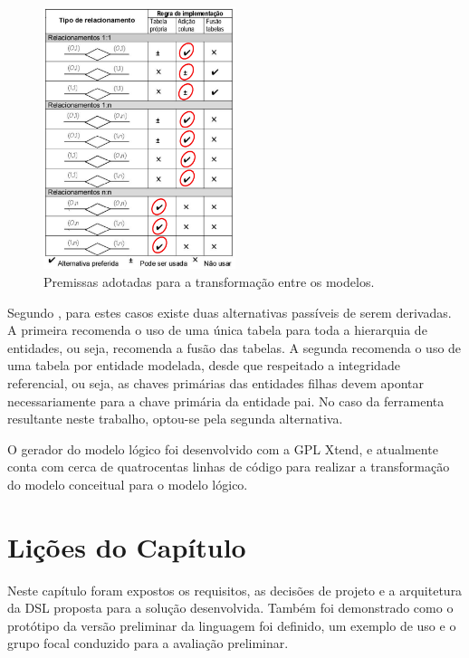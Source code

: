 \begin{figure}[!htb]
    \centering
    \caption{Premissas adotadas para a transformação entre os modelos.}
    \label{fig:Premissas}
    \includegraphics[width=0.5\textwidth]{img/EPS/TabelaMapeamentoRelacionamentos}
\end{figure}

Segundo , para estes casos existe duas alternativas passíveis de serem derivadas. 
A primeira recomenda o uso de uma única tabela para toda a hierarquia de entidades, ou seja, recomenda a fusão das tabelas.
A segunda recomenda o uso de uma tabela por entidade modelada, desde que respeitado a integridade referencial, ou seja, as chaves primárias das entidades filhas devem apontar necessariamente para a chave primária da entidade pai. 
No caso da ferramenta resultante neste trabalho, optou-se pela segunda alternativa. 

O gerador do modelo lógico foi desenvolvido com a \ac{GPL} Xtend, e atualmente conta com cerca de quatrocentas linhas de código para realizar a transformação do modelo conceitual para o modelo lógico. 





\section{Lições do Capítulo} \label{sec:licDSL}

Neste capítulo foram expostos os requisitos, as decisões de projeto e a arquitetura da \ac{DSL} proposta para a solução desenvolvida. 
Também foi demonstrado como o protótipo da versão preliminar da linguagem foi definido, um exemplo de uso e o grupo focal conduzido para a avaliação preliminar.

